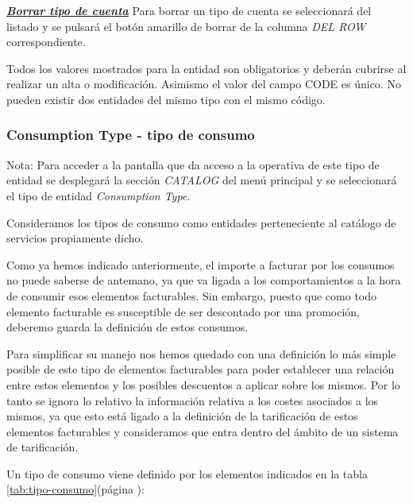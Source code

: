 \underline{\textsl{\textbf{Borrar tipo de cuenta}}}\newline
Para borrar un tipo de cuenta se seleccionará del listado y se pulsará el botón amarillo de borrar de la columna \textit{DEL ROW} correspondiente.\newline

Todos los valores mostrados para la entidad son obligatorios y deberán cubrirse al realizar un alta o modificación. Asimismo el valor del campo CODE es único. No pueden existir dos entidades del mismo tipo con el mismo código.




\subsubsection{Consumption Type - tipo de consumo}
\label{sub:consumption-type}

Nota: Para acceder a la pantalla que da acceso a la operativa de este tipo de entidad se desplegará la sección \emph{CATALOG} del menú principal y se seleccionará el tipo de entidad \emph{Consumption Type}.

Consideramos los tipos de consumo como entidades perteneciente al catálogo de servicios propiamente dicho.

Como ya hemos indicado anteriormente, el importe a facturar por los consumos no puede saberse de antemano, ya que va ligada a los comportamientos a la hora de consumir esos elementos facturables. Sin embargo, puesto que como todo elemento facturable es susceptible de ser descontado por una promoción, deberemo guarda la definición de estos consumos.

Para simplificar su manejo nos hemos quedado con una definición lo más simple posible de este tipo de elementos facturables para poder establecer una relación entre estos elementos y los posibles descuentos a aplicar sobre los mismos. Por lo tanto se ignora lo relativo la información relativa a los costes asociados a los mismos, ya que esto está ligado a la definición de la tarificación de estos elementos facturables y consideramos que entra dentro del ámbito de un sistema de tarificación. 

Un tipo de consumo viene definido por los elementos indicados en la tabla \ref{tab:tipo-consumo}(página \pageref{tab:tipo-consumo}):



